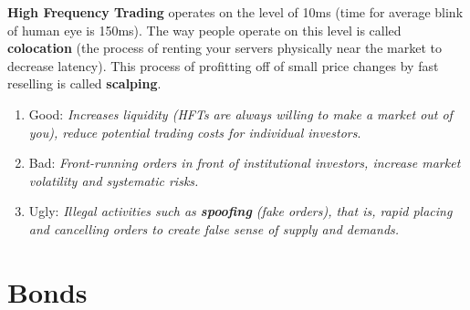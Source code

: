 \documentclass{article}
\begin{document}
    \textbf{High Frequency Trading} operates on the level of 10ms (time for average blink of human eye is 150ms). The way people operate on this level is called \textbf{colocation} (the process of renting your servers physically near the market to decrease latency). This process of profitting off of small price changes by fast reselling is called \textbf{scalping}. 
    \begin{enumerate}
      \item Good: \textit{Increases liquidity (HFTs are always willing to make a market out of you), reduce potential trading costs for individual investors}. 
      \item Bad: \textit{Front-running orders in front of institutional investors, increase market volatility and systematic risks. }
      \item Ugly: \textit{Illegal activities such as \textbf{spoofing} (fake orders), that is, rapid placing and cancelling orders to create false sense of supply and demands. }
    \end{enumerate}

\section{Bonds}
\end{document}
